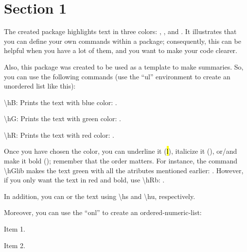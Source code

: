
\section{Section 1}

  The created package highlights text in three colors: , , and .  It illustrates that you can define your own commands within a package; consequently, this can be helpful when you have a lot of them, and you want to make your code clearer.

  Also, this package was created to be used as a template to make summaries.  So, you can use the following commands (use the ``ul'' environment to create an unordered list like this):

  \begin{ul}
    \item \textbackslash hB: Prints the text with blue  color: .
    \item \textbackslash hG: Prints the text with green color: .
    \item \textbackslash hR: Prints the text with red   color: .
  \end{ul}

  Once you have chosen the color, you can underline it (\hl{l}), italicize it (), or/and make it bold (); remember that the order matters.  For instance, the command \textbackslash hGlib makes the text green with all the atributes mentioned earlier: .  However, if you only want the text in red and bold, use \textbackslash hRb: .

  In addition, you can  or  the text using \textbackslash hs and \textbackslash hu, respectively.

  Moreover, you can use the ``onl'' to create an ordered-numeric-list:
  \begin{onl}
    \item Item 1.
    \item Item 2.
  \end{onl}

